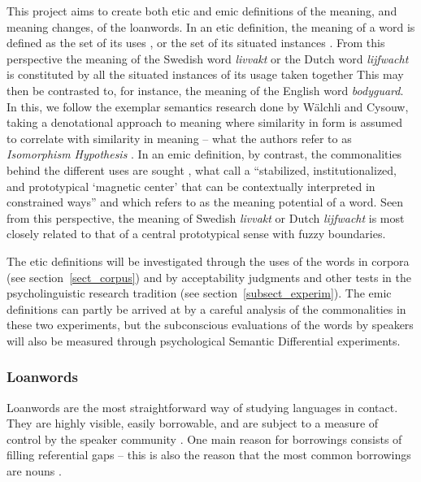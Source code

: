 \documentclass[a4paper]{article}
\begin{document}
This project aims to create both etic and emic definitions of the meaning, and meaning changes, of the loanwords. 
In an etic definition, the meaning of a word is defined as the set of its uses \citep{Koptjevskaja-Tamm2008}, or the set of its situated instances \citep{Evans2009}. 
From this perspective the meaning of the Swedish word \emph{livvakt} or the Dutch word \emph{lijfwacht} is constituted by all the situated instances of its usage taken together
This may then be contrasted to, for instance, the meaning of the English word \emph{bodyguard}. 
In this, we follow the exemplar semantics research done by W{\"a}lchli and Cysouw, taking a denotational approach to meaning where similarity in form is assumed to correlate with similarity in meaning -- what the authors refer to as \emph{Isomorphism Hypothesis} \citep{Walchli2012}. 
In an emic definition, by contrast, the commonalities behind the different uses are sought \citep{Koptjevskaja-Tamm2008}, what \citet{Traugott2001} call a ``stabilized, institutionalized, and prototypical `magnetic center' that can be contextually interpreted in constrained ways'' and which \citet{Linell2005} refers to as the meaning potential of a word. Seen from this perspective, the meaning of Swedish \emph{livvakt} or Dutch \emph{lijfwacht} is most closely related to that of a central prototypical sense with fuzzy boundaries.

The etic definitions will be investigated through the uses of the words in corpora (see section~\ref{sect_corpus}) and by acceptability judgments and other tests in the psycholinguistic research tradition (see section~\ref{subsect_experim}). 
The emic definitions can partly be arrived at by a careful analysis of the commonalities in these two experiments, but the subconscious evaluations of the words by speakers will also be measured through psychological Semantic Differential experiments.


%
\subsubsection{Loanwords}
\label{sect_loanwords}
Loanwords are the most straightforward way of studying languages in contact. 
They are highly visible, easily borrowable, and are subject to a measure of control by the speaker community \citep{Thomason2001}. 
One main reason for borrowings consists of filling referential gaps -- this is also the reason that the most common borrowings are nouns \citep[cf.][p.168]{Matras2009}.
\end{document}
